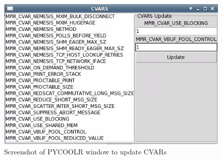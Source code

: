 \begin{center}
        \begin{figure}[tbp!]
         \centering
         \includegraphics[scale=0.5,keepaspectratio]{figures/Pycoolr-CVARs}
         \caption{Screenshot of PYCOOLR window to update CVARs}
         \label{fig:pycoolrcvars}
        \end{figure}
\end{center}

